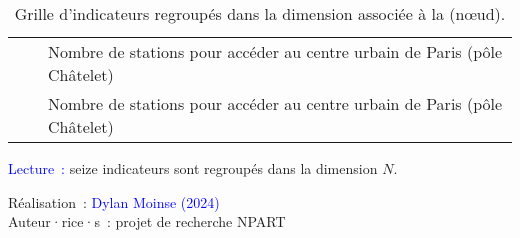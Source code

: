 \begin{table}[h!]
{\begin{tabular}{p{}p{}p{}}
& \small{\multirow{1.5}{*}{\(N_{15}\)}} & \small{Nombre de stations pour accéder au centre urbain de Paris (pôle Châtelet)}\\
& \small{\multirow{1.5}{*}{\(N_{16}\)}} & \small{Nombre de stations pour accéder au centre urbain de Paris (pôle Châtelet)}\\
        \hline
        \end{tabular}}
    \caption{Grille d'indicateurs regroupés dans la dimension associée à la  (nœud).}
    \label{table-chap6:indicateurs-node}
        \vspace{5pt}
        \begin{flushleft}\scriptsize{
        \textcolor{blue}{Lecture~:} seize indicateurs sont regroupés dans la dimension \(N\). 
        }\end{flushleft}
        \begin{flushright}\scriptsize{
        Réalisation~: \textcolor{blue}{Dylan Moinse (2024)}
        \\
        Auteur·rice·s~: projet de recherche \acrshort{NPART}
        }\end{flushright}
        \end{table}